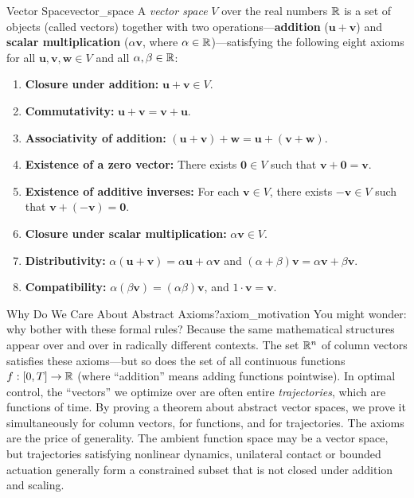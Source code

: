 \begin{definition}{Vector Space}{vector_space}
A \emph{vector space} $V$ over the real numbers $\mathbb{R}$ is a set of objects (called vectors) together with two operations---\textbf{addition} ($\mathbf{u} + \mathbf{v}$) and \textbf{scalar multiplication} ($\alpha \mathbf{v}$, where $\alpha \in \mathbb{R}$)---satisfying the following eight axioms for all $\mathbf{u}, \mathbf{v}, \mathbf{w} \in V$ and all $\alpha, \beta \in \mathbb{R}$:

\begin{enumerate}[label=(\roman*)]
    \item \textbf{Closure under addition:} $\mathbf{u} + \mathbf{v} \in V$.
    \item \textbf{Commutativity:} $\mathbf{u} + \mathbf{v} = \mathbf{v} + \mathbf{u}$.
    \item \textbf{Associativity of addition:} $(\mathbf{u} + \mathbf{v}) + \mathbf{w} = \mathbf{u} + (\mathbf{v} + \mathbf{w})$.
    \item \textbf{Existence of a zero vector:} There exists $\mathbf{0} \in V$ such that $\mathbf{v} + \mathbf{0} = \mathbf{v}$.
    \item \textbf{Existence of additive inverses:} For each $\mathbf{v} \in V$, there exists $-\mathbf{v} \in V$ such that $\mathbf{v} + (-\mathbf{v}) = \mathbf{0}$.
    \item \textbf{Closure under scalar multiplication:} $\alpha \mathbf{v} \in V$.
    \item \textbf{Distributivity:} $\alpha(\mathbf{u} + \mathbf{v}) = \alpha \mathbf{u} + \alpha \mathbf{v}$ \; and \; $(\alpha + \beta)\mathbf{v} = \alpha \mathbf{v} + \beta \mathbf{v}$.
    \item \textbf{Compatibility:} $\alpha(\beta \mathbf{v}) = (\alpha\beta)\mathbf{v}$, \; and \; $1 \cdot \mathbf{v} = \mathbf{v}$.
\end{enumerate}
\end{definition}

\begin{laymansbox}{Why Do We Care About Abstract Axioms?}{axiom_motivation}
You might wonder: why bother with these formal rules? Because the same mathematical structures appear over and over in radically different contexts. The set $\mathbb{R}^n$ of column vectors satisfies these axioms---but so does the set of all continuous functions $f: [0, T] \to \mathbb{R}$ (where ``addition'' means adding functions pointwise). In optimal control, the ``vectors'' we optimize over are often entire \emph{trajectories}, which are functions of time. By proving a theorem about abstract vector spaces, we prove it simultaneously for column vectors, for functions, and for trajectories. The axioms are the price of generality. The ambient function space may be a vector space, but trajectories satisfying nonlinear dynamics, unilateral contact or bounded actuation generally form a constrained subset that is not closed under addition and scaling.
\end{laymansbox}


